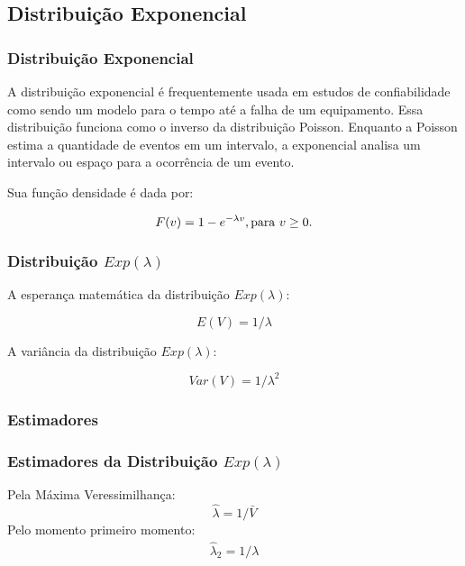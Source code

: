 \subsection{Distribuição Exponencial}
\begin{frame}
\frametitle{Distribuição Exponencial}
A distribuição exponencial é frequentemente usada em estudos de confiabilidade como sendo um modelo para o tempo até a falha de um equipamento. Essa distribuição funciona como o inverso da distribuição Poisson. Enquanto a Poisson estima a quantidade de eventos em um intervalo, a exponencial analisa um intervalo ou espaço para a ocorrência de um evento. 

Sua função densidade é dada por:

\begin{equation}
 F(v) = 1 - e^{-\lambda v}, \textnormal{para } v \geq 0.
\end{equation}

\end{frame}

\begin{frame}
\frametitle{Distribuição $Exp(\lambda)$}

A esperança matemática da distribuição $Exp(\lambda)$:

\begin{equation}
\label{eq:Exp_esp}
E(V)=1/\lambda
\end{equation}\pause

A variância da distribuição $Exp(\lambda)$:

\begin{equation}
\label{eq:Esp_var}
Var(V)=1/\lambda^2
\end{equation}

\end{frame}

\subsubsection{Estimadores}
\begin{frame}
\frametitle{Estimadores da Distribuição $Exp(\lambda)$}
Pela Máxima Veressimilhança:
\small \begin{equation}
\label{eq:Exp_MV}
\hat{\lambda}=1/\bar{V}
\end{equation} \pause
Pelo momento primeiro momento:
\begin{eqnarray}
\label{eq:Exp_m_p2}
\hat{\lambda}_{2}=1/\lambda
\end{eqnarray}
\end{frame}

